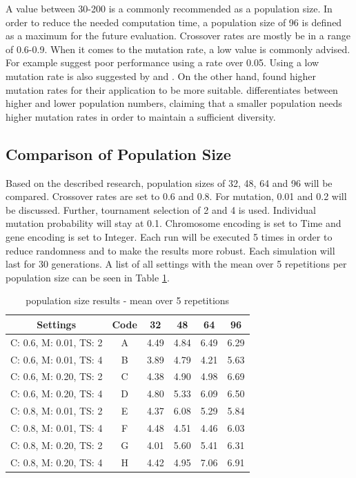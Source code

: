 A value between 30-200 is a commonly recommended as a population size. In order to reduce the needed computation time, a population size of 96 is defined as a maximum for the future evaluation. Crossover rates are mostly be in a range of 0.6-0.9. When it comes to the mutation rate, a low value is commonly advised. For example \cite{grefenstette_optimization_1986} suggest poor performance using a rate over 0.05. Using a low mutation rate is also suggested by \cite{whitley_genetic_1994} and \cite{jinghui_zhong_comparison_2005}. On the other hand, \cite{boyabatli_parameter_2004} found higher mutation rates for their application to be more suitable. \cite{srinivas_genetic_1994} differentiates between higher and lower population numbers, claiming that a smaller population needs higher mutation rates in order to maintain a sufficient diversity.

\subsection{Comparison of Population Size}
Based on the described research, population sizes of 32, 48, 64 and 96 will be compared. Crossover rates are set to 0.6 and 0.8. For mutation, 0.01 and 0.2 will be discussed. Further, tournament selection of 2 and 4 is used.
Individual mutation probability will stay at 0.1. Chromosome encoding is set to Time and gene encoding is set to Integer. 
Each run will be executed 5 times in order to reduce randomness and to make the results more robust. Each simulation will last for 30 generations. A list of all settings with the mean over 5 repetitions per population size can be seen in Table \ref{tab:hyperparameter_tuning:pop_settings_results}.

\begin{table}[ht]
	\centering
	\begin{tabular}{ c|c|cccc  }
		\hline
		Settings & Code & 32 & 48 & 64 & 96\\
		\hline
		C: 0.6, M: 0.01, TS: 2   	& A & 4.49 & 4.84 & 6.49 & 6.29 \\
		C: 0.6, M: 0.01, TS: 4		& B & 3.89 & 4.79 & 4.21 & 5.63 \\ 
		C: 0.6, M: 0.20, TS: 2 		& C & 4.38 & 4.90 & 4.98 & 6.69 \\
		C: 0.6, M: 0.20, TS: 4    	& D & 4.80 & 5.33 & 6.09 & 6.50 \\
		C: 0.8, M: 0.01, TS: 2   	& E & 4.37 & 6.08 & 5.29 & 5.84 \\
		C: 0.8, M: 0.01, TS: 4		& F & 4.48 & 4.51 & 4.46 & 6.03 \\
		C: 0.8, M: 0.20, TS: 2 		& G & 4.01 & 5.60 & 5.41 & 6.31 \\
		C: 0.8, M: 0.20, TS: 4    	& H & 4.42 & 4.95 & 7.06 & 6.91 \\
		\hline
	\end{tabular}
	\caption{population size results - mean over 5 repetitions}
	\label{tab:hyperparameter_tuning:pop_settings_results}
\end{table}

